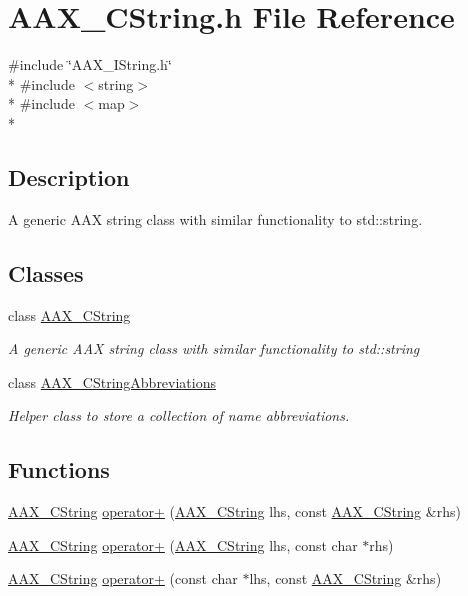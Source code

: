 \hypertarget{a00197}{}\section{A\+A\+X\+\_\+\+C\+String.\+h File Reference}
\label{a00197}
{\ttfamily \#include \char`\"{}A\+A\+X\+\_\+\+I\+String.\+h\char`\"{}}\\*
{\ttfamily \#include $<$string$>$}\\*
{\ttfamily \#include $<$map$>$}\\*


\subsection{Description}
A generic A\+A\+X string class with similar functionality to std\+::string. 

\subsection*{Classes}
\begin{DoxyCompactItemize}
\item 
class \hyperlink{a00042}{A\+A\+X\+\_\+\+C\+String}
\begin{DoxyCompactList}\small\item\em A generic A\+A\+X string class with similar functionality to {\ttfamily std\+::string} \end{DoxyCompactList}\item 
class \hyperlink{a00043}{A\+A\+X\+\_\+\+C\+String\+Abbreviations}
\begin{DoxyCompactList}\small\item\em Helper class to store a collection of name abbreviations. \end{DoxyCompactList}\end{DoxyCompactItemize}
\subsection*{Functions}
\begin{DoxyCompactItemize}
\item 
\hyperlink{a00042}{A\+A\+X\+\_\+\+C\+String} \hyperlink{a00197_a5bf83a824cd277ac11bd58486a49ce1d}{operator+} (\hyperlink{a00042}{A\+A\+X\+\_\+\+C\+String} lhs, const \hyperlink{a00042}{A\+A\+X\+\_\+\+C\+String} \&rhs)
\item 
\hyperlink{a00042}{A\+A\+X\+\_\+\+C\+String} \hyperlink{a00197_a8e2b213f22b3491833529fede1e9af40}{operator+} (\hyperlink{a00042}{A\+A\+X\+\_\+\+C\+String} lhs, const char $\ast$rhs)
\item 
\hyperlink{a00042}{A\+A\+X\+\_\+\+C\+String} \hyperlink{a00197_ac422f2c6ebf5186deec4a94480709747}{operator+} (const char $\ast$lhs, const \hyperlink{a00042}{A\+A\+X\+\_\+\+C\+String} \&rhs)
\end{DoxyCompactItemize}


